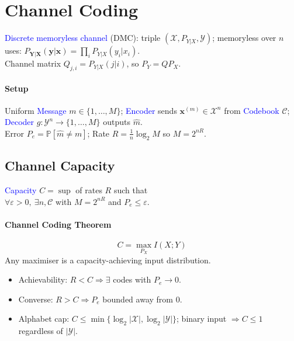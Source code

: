 \section{Channel Coding}
\textcolor{Blue}{Discrete memoryless channel} (DMC): triple $(\mathcal X,P_{Y|X},\mathcal Y)$; memoryless over $n$ uses: $P_{\mathbf Y|\mathbf X}(\mathbf y|\mathbf x)=\prod_i P_{Y|X}(y_i|x_i)$.\\
\textcolor{Bittersweet}{Channel matrix} $Q_{j,i}=P_{Y|X}(j|i)$, so $P_Y=QP_X$.
\paragraph{Setup} Uniform \textcolor{Blue}{Message} $m\in\{1,\ldots,M\}$; \textcolor{Blue}{Encoder} sends $\mathbf x^{(m)}\in\mathcal X^n$ from \textcolor{Blue}{Codebook} $\mathcal C$; \textcolor{Blue}{Decoder} $g:\mathcal Y^n\to\{1,\ldots,M\}$ outputs $\hat m$.\\
\textcolor{Bittersweet}{Error} $P_e=\mathbb P[\hat m\neq m]$; \textcolor{Bittersweet}{Rate} $R=\tfrac{1}{n}\log_2 M$ so $M=2^{nR}$.

\subsection{Channel Capacity}
\textcolor{Blue}{Capacity} $C=\sup$ of rates $R$ such that\\
$\forall\varepsilon>0,\ \exists n,\mathcal C$ with $M=2^{nR}$ and $P_e\le\varepsilon$.
\paragraph{Channel Coding Theorem}
\[\boxed{\;C=\max_{P_X} I(X;Y)\;}\]
Any maximiser is a \textcolor{Bittersweet}{capacity-achieving input distribution}.
\begin{itemize}
  \item \textcolor{Bittersweet}{Achievability}: $R<C\Rightarrow\exists$ codes with $P_e\to 0$.
  \item \textcolor{Bittersweet}{Converse}: $R>C\Rightarrow P_e$ bounded away from $0$.
  \item \textcolor{Bittersweet}{Alphabet cap}: $C\le\min\{\log_2|\mathcal X|,\log_2|\mathcal Y|\}$; binary input $\Rightarrow C\le 1$ regardless of $|\mathcal Y|$.
\end{itemize}


